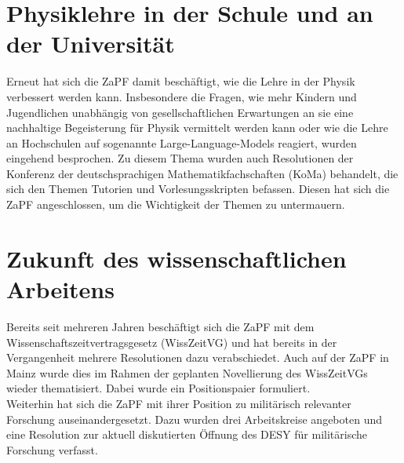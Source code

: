 \documentclass{scrartcl}
\begin{document}
	\section*{Physiklehre in der Schule und an der Universität}
	Erneut hat sich die ZaPF damit beschäftigt, wie die Lehre in der Physik verbessert werden kann. Insbesondere die Fragen, wie mehr Kindern und Jugendlichen unabhängig von gesellschaftlichen Erwartungen an sie eine nachhaltige Begeisterung für Physik vermittelt werden kann oder wie die Lehre an Hochschulen auf sogenannte Large-Language-Models reagiert, wurden eingehend besprochen.
	Zu diesem Thema wurden auch Resolutionen der Konferenz der deutschsprachigen Mathematikfachschaften (KoMa) behandelt, die sich den Themen Tutorien und Vorlesungsskripten befassen. Diesen hat sich die ZaPF angeschlossen, um die Wichtigkeit der Themen zu untermauern.
	
	\section*{Zukunft des wissenschaftlichen Arbeitens}
	Bereits seit mehreren Jahren beschäftigt sich die ZaPF mit dem Wissenschaftszeitvertragsgesetz (WissZeitVG) und hat bereits in der Vergangenheit mehrere Resolutionen dazu verabschiedet. Auch auf der ZaPF in Mainz wurde dies im Rahmen der geplanten Novellierung des WissZeitVGs wieder thematisiert. Dabei wurde ein Positionspaier formuliert.\\
	Weiterhin hat sich die ZaPF mit ihrer Position zu militärisch relevanter Forschung auseinandergesetzt. Dazu wurden drei Arbeitskreise angeboten und eine Resolution zur aktuell diskutierten Öffnung des DESY für militärische Forschung verfasst.
\end{document}
